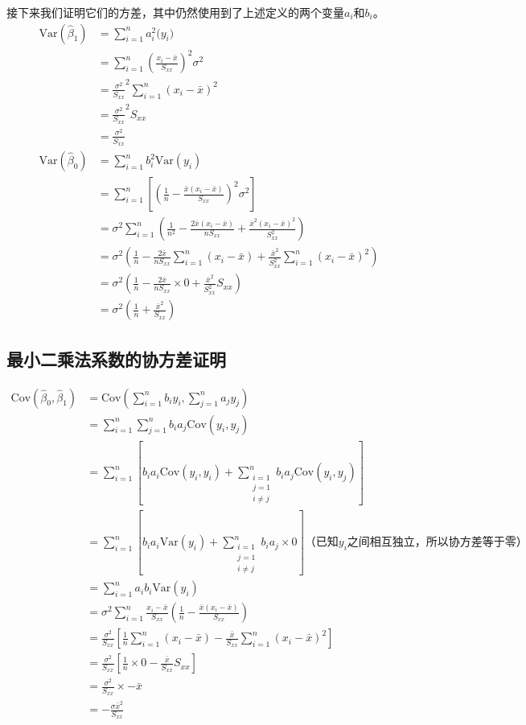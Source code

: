\documentclass[UTF8]{ctexbook}
\begin{document}
接下来我们证明它们的方差，其中仍然使用到了上述定义的两个变量$a_i$和$b_i$。
\begin{align*}
	\mathrm{Var}(\hat\beta_1)&=\sum_{i=1}^na_i^2\mathrm(y_i)\\
	&=\sum_{i=1}^n\left(\frac{x_i-\bar x}{S_{xx}}\right)^2\sigma^2\\
	&=\frac{\sigma^2}{S_{xx}}^2\sum_{i=1}^n(x_i-\bar x)^2\\
	&=\frac{\sigma^2}{S_{xx}}^2S_{xx}\\
	&=\frac{\sigma^2}{S_{xx}}\\
	\mathrm{Var}(\hat\beta_0)&=\sum_{i=1}^nb_i^2\mathrm{Var}(y_i)\\
	&=\sum_{i=1}^n\left[\left(\frac{1}{n}-\frac{\bar x(x_i-\bar x)}{S_{xx}}\right)^2\sigma^2\right]\\
	&=\sigma^2\sum_{i=1}^n\left(\frac{1}{n^2}-\frac{2\bar x(x_i-\bar x)}{nS_{xx}}+\frac{\bar x^2(x_i-\bar x)^2}{S_{xx}^2}\right)\\
	&=\sigma^2\left(\frac{1}{n}-\frac{2\bar x}{nS_{xx}}\sum_{i=1}^n(x_i-\bar x)+\frac{\bar x^2}{S_{xx}^2}\sum_{i=1}^n(x_i-\bar x)^2\right)\\
	&=\sigma^2\left(\frac{1}{n}-\frac{2\bar x}{nS_{xx}}\times 0+\frac{\bar x^2}{S_{xx}^2}S_{xx}\right)\\
	&=\sigma^2\left(\frac{1}{n}+\frac{\bar x^2}{S_{xx}}\right)
\end{align*}

\subsection{最小二乘法系数的协方差证明}
\label{proof18}
\begin{align*}
	\mathrm{Cov}(\hat\beta_0,\hat\beta_1)&=\mathrm{Cov}(\sum_{i=1}^nb_iy_i,\sum_{j=1}^na_jy_j)\\
	&=\sum_{i=1}^n\sum_{j=1}^nb_ia_j\mathrm{Cov}(y_i,y_j)\\
	&=\sum_{i=1}^n\left[b_ia_i\mathrm{Cov}(y_i,y_i)+\sum_{\substack{i=1\\j=1\\i\neq j}}^nb_ia_j\mathrm{Cov}(y_i,y_j)\right]\\
	&=\sum_{i=1}^n\left[b_ia_i\mathrm{Var}(y_i)+\sum_{\substack{i=1\\j=1\\i\neq j}}^nb_ia_j\times 0\right]\text{（已知$y_i$之间相互独立，所以协方差等于零）}\\
	&=\sum_{i=1}^na_ib_i\mathrm{Var}(y_i)\\
	&=\sigma^2\sum_{i=1}^n\frac{x_i-\bar x}{S_{xx}}\left(\frac{1}{n}-\frac{\bar x(x_i-\bar x)}{S_{xx}}\right)\\
	&=\frac{\sigma^2}{S_{xx}}\left[\frac{1}{n}\sum_{i=1}^n(x_i-\bar x)-\frac{\bar x}{S_{xx}}\sum_{i=1}^n(x_i-\bar x)^2\right]\\
	&=\frac{\sigma^2}{S_{xx}}\left[\frac{1}{n}\times 0-\frac{\bar x}{S_{xx}}S_{xx}\right]\\
	&=\frac{\sigma^2}{S_{xx}}\times-\bar x\\
	&=-\frac{\sigma\bar x^2}{S_{xx}}
\end{align*}
\end{document}
